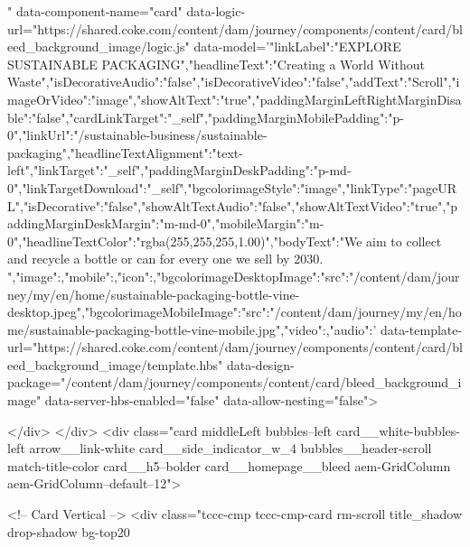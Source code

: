   " data-component-name="card" data-logic-url="https://shared.coke.com/content/dam/journey/components/content/card/bleed_background_image/logic.js" data-model='{"linkLabel":"EXPLORE SUSTAINABLE PACKAGING","headlineText":"Creating a World Without Waste","isDecorativeAudio":"false","isDecorativeVideo":"false","addText":"Scroll","imageOrVideo":"image","showAltText":"true","paddingMarginLeftRightMarginDisable":"false","cardLinkTarget":"_self","paddingMarginMobilePadding":"p-0","linkUrl":"/sustainable-business/sustainable-packaging","headlineTextAlignment":"text-left","linkTarget":"_self","paddingMarginDeskPadding":"p-md-0","linkTargetDownload":"_self","bgcolorimageStyle":"image","linkType":"pageURL","isDecorative":"false","showAltTextAudio":"false","showAltTextVideo":"true","paddingMarginDeskMargin":"m-md-0","mobileMargin":"m-0","headlineTextColor":"rgba(255,255,255,1.00)","bodyText":"We aim to collect and recycle a bottle or can for every one we sell by 2030. ","image":{},"mobile":{},"icon":{},"bgcolorimageDesktopImage":{"src":"/content/dam/journey/my/en/home/sustainable-packaging-bottle-vine-desktop.jpeg"},"bgcolorimageMobileImage":{"src":"/content/dam/journey/my/en/home/sustainable-packaging-bottle-vine-mobile.jpg"},"video":{},"audio":{}}' data-template-url="https://shared.coke.com/content/dam/journey/components/content/card/bleed_background_image/template.hbs" data-design-package="/content/dam/journey/components/content/card/bleed_background_image" data-server-hbs-enabled="false" data-allow-nesting="false">
  
  
</div>
</div>
<div class="card middleLeft bubbles--left card__white-bubbles-left arrow__link-white card__side_indicator_w_4 bubbles__header-scroll match-title-color card__h5--bolder card__homepage__bleed aem-GridColumn aem-GridColumn--default--12">
    




  



<!-- Card Vertical -->
<div class="tccc-cmp tccc-cmp-card rm-scroll title_shadow drop-shadow bg-top20 
  
